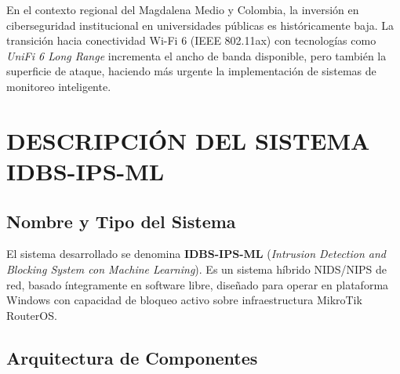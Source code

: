 \documentclass[12pt, letterpaper, oneside]{report}
\begin{document}
En el contexto regional del Magdalena Medio y Colombia, la inversión en ciberseguridad institucional en universidades públicas es históricamente baja. La transición hacia conectividad Wi-Fi 6 (IEEE 802.11ax) con tecnologías como \textit{UniFi 6 Long Range} incrementa el ancho de banda disponible, pero también la superficie de ataque, haciendo más urgente la implementación de sistemas de monitoreo inteligente.

\chapter{DESCRIPCIÓN DEL SISTEMA IDBS-IPS-ML}

\section{Nombre y Tipo del Sistema}

El sistema desarrollado se denomina \textbf{IDBS-IPS-ML} (\textit{Intrusion Detection and Blocking System con Machine Learning}). Es un sistema híbrido NIDS/NIPS de red, basado íntegramente en software libre, diseñado para operar en plataforma Windows con capacidad de bloqueo activo sobre infraestructura MikroTik RouterOS.

\section{Arquitectura de Componentes}
\end{document}
